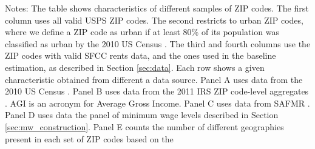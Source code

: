 \begin{landscape}
\begin{table}[hbt!]
    \begin{minipage}{.95\linewidth} \footnotesize
        \vspace{2mm}
        Notes: The table shows characteristics of different samples of ZIP codes.
        The first column uses all valid USPS ZIP codes.
        The second restricts to urban ZIP codes, where we define a ZIP code as 
        urban if at least 80\% of its population was classified as urban 
        by the 2010 US Census \parencite{CensusDecennial}.
        The third and fourth columns use the ZIP codes with valid SFCC rents 
        data, and the ones used in the baseline estimation, as described in
        Section \ref{sec:data}.
        Each row shows a given characteristic obtained from different a data 
        source.
        Panel A uses data from the 2010 US Census \parencite{CensusDecennial}.
        Panel B uses data from the 2011 IRS ZIP code-level aggregates
        \parencite{IRS}. AGI is an acronym for Average Gross Income.
        Panel C uses data from SAFMR \parencite{hudSAFMR}.
        Panel D uses data the panel of minimum wage levels described in 
        Section \ref{sec:mw_construction}.
        Panel E counts the number of different geographies present in each set
        of ZIP codes based on the 
    \end{minipage}
\end{table}
\end{landscape}
